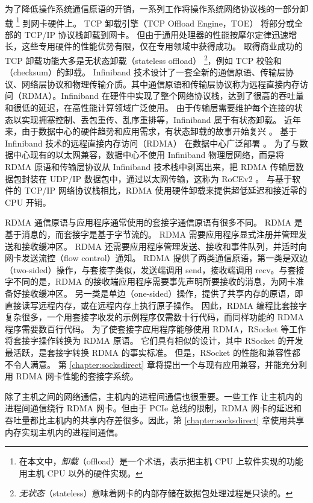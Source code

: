为了降低操作系统通信原语的开销，一系列工作将操作系统网络协议栈的一部分卸载 \footnote{在本文中，\textit{卸载}（offload）是一个术语，表示把主机 CPU 上软件实现的功能用主机 CPU 以外的硬件实现。} 到网卡硬件上。
TCP 卸载引擎（TCP Offload Engine，TOE） \cite {tcp-chimney-offload} 将部分或全部的 TCP/IP 协议栈卸载到网卡。
但由于通用处理器的性能按摩尔定律迅速增长，这些专用硬件的性能优势有限，仅在专用领域中获得成功。
取得商业成功的 TCP 卸载功能大多是无状态卸载（stateless offload） \footnote{\textit{无状态}（stateless）意味着网卡的内部存储在数据包处理过程是只读的。}，例如 TCP 校验和（checksum）的卸载。
Infiniband \cite{infiniband2000infiniband} 技术设计了一套全新的通信原语、传输层协议、网络层协议和物理传输介质。其中通信原语和传输层协议称为远程直接内存访问（RDMA）。Infiniband 在硬件中实现了整个网络协议栈，达到了很高的吞吐量和很低的延迟，在高性能计算领域广泛使用。
由于传输层需要维护每个连接的状态以实现拥塞控制、丢包重传、乱序重排等，Infiniband 属于有状态卸载。
近年来，由于数据中心的硬件趋势和应用需求，有状态卸载的故事开始复兴 \cite {chuanxiong-rdma-keynote}。
基于 Infiniband 技术的远程直接内存访问（RDMA） \cite {infiniband2000infiniband} 在数据中心广泛部署 \cite {guo2016rdma}。
为了与数据中心现有的以太网兼容，数据中心不使用 Infiniband 物理层网络，而是将 RDMA 原语和传输层协议从 Infiniband 技术栈中剥离出来，把 RDMA 传输层数据包封装在 UDP/IP 数据包中，通过以太网传输，这称为 RoCEv2 \cite{rocev2}。
与基于软件的 TCP/IP 网络协议栈相比，RDMA 使用硬件卸载来提供超低延迟和接近零的 CPU 开销。

RDMA 通信原语与应用程序通常使用的套接字通信原语有很多不同。
RDMA 是基于消息的，而套接字是基于字节流的。
RDMA 需要应用程序显式注册并管理发送和接收缓冲区。
RDMA 还需要应用程序管理发送、接收和事件队列，并适时向网卡发送流控（flow control）通知。
RDMA 提供了两类通信原语，第一类是双边（two-sided）操作，与套接字类似，发送端调用 send，接收端调用 recv。与套接字不同的是，RDMA 的接收端应用程序需要事先声明所要接收的消息，为网卡准备好接收缓冲区。
另一类是单边（one-sided）操作，提供了共享内存的原语，即直接读写远程内存，或在远程内存上执行原子操作。
因此，RDMA 编程比套接字复杂很多，一个用套接字收发的示例程序仅需数十行代码，而同样功能的 RDMA 程序需要数百行代码。
为了使套接字应用程序能够使用 RDMA，RSocket 等工作 \cite {rsockets,socketsdirect,russell2008extended} 将套接字操作转换为 RDMA 原语。
它们具有相似的设计，其中 RSocket 的开发最活跃，是套接字转换 RDMA 的事实标准。
但是，RSocket 的性能和兼容性都不令人满意。
第 \ref{chapter:socksdirect} 章将提出一个与现有应用兼容，并能充分利用 RDMA 网卡性能的套接字系统。

除了主机之间的网络通信，主机内的进程间通信也很重要。一些工作 \cite {belay2017ix,peter2016arrakis,rsockets} 让主机内的进程间通信绕行 RDMA 网卡。但由于 PCIe 总线的限制，RDMA 网卡的延迟和吞吐量都比主机内的共享内存差很多。因此，第 \ref{chapter:socksdirect} 章使用共享内存实现主机内的进程间通信。


